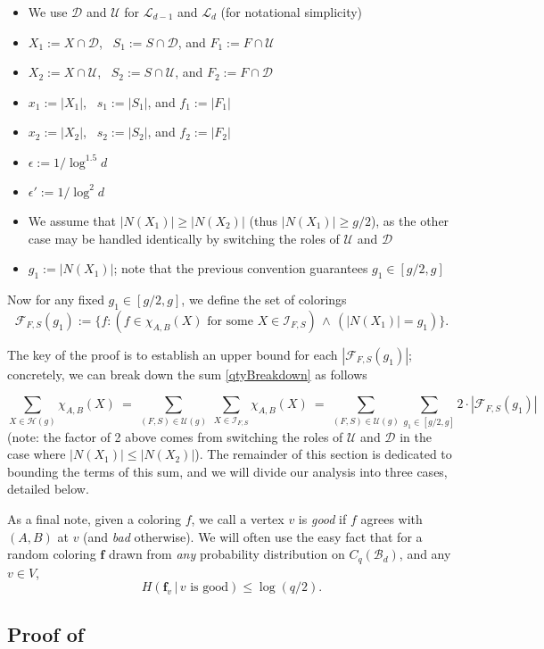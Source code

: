 \documentclass{amsart}
\theoremstyle{definition}
\newcommand{\cB}{\mathcal{B} }
\newcommand{\cD}{\mathcal{D} }
\newcommand{\cF}{\mathcal{F} }
\newcommand{\cH}{\mathcal{H} }
\newcommand{\cI}{\mathcal{I} }
\newcommand{\cL}{\mathcal{L} }
\newcommand{\cU}{\mathcal{U} }
\newcommand{\bbf}{\mathbf{f}}
\newcommand{\beq}[1]{\begin{equation}\label{#1}}
\newcommand{\enq}[0]{\end{equation}}
\newcommand{\eps}{\epsilon}
\newcommand{\0}[0]{\emptyset}
\begin{document}
\begin{itemize}
	\item We use $\cD$ and $\cU$ for $\cL_{d-1}$ and $\cL_d$ (for notational simplicity) 
	\item $X_1:=X \cap \cD$, \ $S_1:=S \cap \cD$, and $F_1:=F \cap \cU$
	\item $X_2:=X \cap \cU$, \ $S_2:=S \cap \cU$, and $F_2:=F \cap \cD$
	\item $x_1:=|X_1|$, \ $s_1:=|S_1|$, and $f_1:=|F_1|$
	\item $x_2:=|X_2|$, \ $s_2:=|S_2|$, and $f_2:=|F_2|$
	\item $\eps:=1/\log^{1.5} d$ 
	\item $\eps':=1/\log^2 d$
	\item We assume that $|N(X_1)| \ge |N(X_2)|$ (thus $|N(X_1)| \ge g/2$), as the other case may be handled identically by switching the roles of $\cU$ and $\cD$
	\item $g_1:=|N(X_1)|$; note that the previous convention guarantees $g_1 \in [g/2,g]$
\end{itemize} 
Now for any fixed $g_1\in [g/2, g]$, we define the set of colorings
\beq{f.chosen}
\cF_{F, S}(g_1):=\big\{f : \left(\mbox{$f \in \chi_{A,B}(X)$ for some $X\in\mathcal{I}_{F, S}$}\right) \,\wedge\, \left(|N(X_1)|=g_1\right)\big\}. \enq

The key of the proof is to establish an upper bound for each $|\cF_{F, S}(g_1)|$; concretely, we can break down the sum \eqref{qtyBreakdown} as follows



\beq{qtyFinalBdown}\sum_{X\in\cH(g)}\chi_{A, B}(X)\ = \
	\sum_{(F,S)\in\cU(g)}\ \sum_{X\in \cI_{F,S}} \chi_{A,B}(X)\ =\ \sum_{(F, S)\in \cU(g)}\sum_{g_1\in[g/2, g]}2\cdot |\cF_{F, S}(g_1)|
\enq
(note: the factor of 2 above comes from switching the roles of $\cU$ and $\cD$ in the case where $|N(X_1)| \le |N(X_2)|$). The remainder of this section is dedicated to bounding the terms of this sum, and we will divide our analysis into three cases, detailed below.



As a final note, given a coloring $f$, we call a vertex $v$ is \textit{good} if $f$ agrees with $(A,B)$ at $v$ (and \textit{bad} otherwise). 
We will often use the easy fact that for a random coloring $\bbf$ drawn from \textit{any} probability distribution on $C_q(\cB_d)$, and any $v\in V$,
\beq{triv.bd} \mbox{$H(\bbf_v\,|\,v \text{ is good}) \le \log (q/2)$.}
\enq

\subsection{Proof of }\label{subsec.step2.pf}
\end{document}
